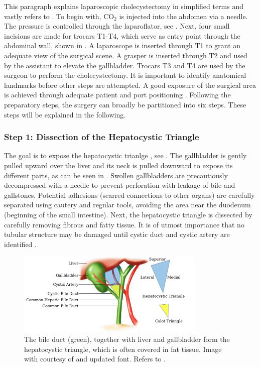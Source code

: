 This paragraph explains laparoscopic cholecystectomy in simplified terms and vastly refers to \cite{ALES5766}. To begin with, $\text{CO}_2$ is injected into the abdomen via a needle. The pressure is controlled through the laparoflator, see . Next, four small incisions are made for trocars T1-T4, which serve as entry point through the abdominal wall, shown in . A laparoscope is inserted through T1 to grant an adequate view of the surgical scene. A grasper is inserted through T2 and used by the assistant to elevate the gallbladder. Trocars T3 and T4 are used by the surgeon to perform the cholecystectomy. It is important to identify anatomical landmarks before other steps are attempted. A good exposure of the surgical area is achieved through adequate patient and port positioning \cite{gupta2023achieve}. Following the preparatory steps, the surgery can broadly be partitioned into six steps. These steps will be explained in the following.

\subsubsection{Step 1: Dissection of the Hepatocystic Triangle}
The goal is to expose the hepatocystic trianlge \cite{mischinger2020critical}, see . The gallbladder is gently pulled upward over the liver and its neck is pulled downward to expose its different parts, as can be seen in . Swollen gallbladders are precautiously decompressed with a needle to prevent perforation with leakage of bile and gallstones. Potential adhesions (scarred connections to other organs) are carefully separated using cautery and regular tools, avoiding the area near the duodenum (beginning of the small intestine). Next, the hepatocystic triangle is dissected by carefully removing fibrous and fatty tissue. It is of utmost importance that no tubular structure may be damaged until cystic duct and cystic artery are identified \cite{mischinger2020critical}.
\begin{figure}[tb]
    \centering
    \includegraphics[width=0.8\textwidth]{introduction/fig/24_02_03_hepatocystic_triangle.jpg}
    \caption{The bile duct (green), together with liver and gallbladder form the hepatocystic triangle, which is often covered in fat tissue. Image with courtesy of \cite{mischinger2020critical} and updated font. Refers to .}
    \label{in:fig:hepatocystic_triangle}
\end{figure}


